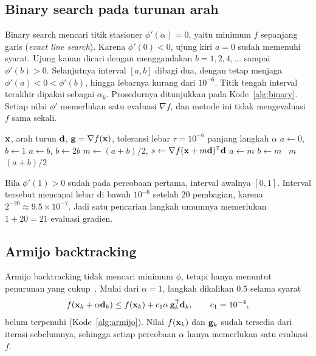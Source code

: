 \documentclass[12pt,a4paper]{article}
\begin{document}
\subsection{Binary search pada turunan arah}
Binary search mencari titik stasioner $\phi'(\alpha)=0$, yaitu minimum $f$ sepanjang garis (\emph{exact line
search}). Karena $\phi'(0)<0$, ujung kiri $a=0$ sudah memenuhi syarat. Ujung kanan dicari dengan menggandakan
$b=1,2,4,\dots$ sampai $\phi'(b)>0$. Selanjutnya interval $[a,b]$ dibagi dua, dengan tetap menjaga
$\phi'(a)<0<\phi'(b)$, hingga lebarnya kurang dari $10^{-6}$. Titik tengah interval terakhir dipakai sebagai
$\alpha_k$. Prosedurnya ditunjukkan pada Kode~\ref{alg:binary}. Setiap nilai $\phi'$ memerlukan satu evaluasi
$\nabla f$, dan metode ini tidak mengevaluasi $f$ sama sekali.

\begin{algorithm}[H]
\caption{Binary search pada $\phi'(\alpha)$.}\label{alg:binary}
\begin{algorithmic}[1]
\Require $\mathbf{x}$, arah turun $\mathbf{d}$, $\mathbf{g}=\nabla f(\mathbf{x})$, toleransi lebar $\tau=10^{-6}$
\Ensure panjang langkah $\alpha$
\State $a\gets0$, $b\gets1$
 
  \State $a\gets b$, $b\gets2b$
\EndWhile
{}
  \State $m\gets(a+b)/2$, $s\gets\nabla f(\mathbf{x}+m\mathbf{d})^{\mathsf{T}}\mathbf{d}$
   $a\gets m$  $b\gets m$ \Else\ \Return $m$ \EndIf
\EndWhile
\State \Return $(a+b)/2$
\end{algorithmic}
\end{algorithm}

Bila $\phi'(1)>0$ sudah pada percobaan pertama, interval awalnya $[0,1]$. Interval tersebut mencapai lebar di bawah
$10^{-6}$ setelah $20$ pembagian, karena $2^{-20}\approx9.5\times10^{-7}$. Jadi satu pencarian langkah umumnya
memerlukan $1+20=21$ evaluasi gradien.

\subsection{Armijo backtracking}
Armijo backtracking tidak mencari minimum $\phi$, tetapi hanya menuntut penurunan yang cukup~\cite{armijo}.
Mulai dari $\alpha=1$, langkah dikalikan $0.5$ selama syarat
\begin{equation}\label{eq:armijo}
f(\mathbf{x}_k+\alpha\mathbf{d}_k)\le f(\mathbf{x}_k)+c_1\alpha\,\mathbf{g}_k^{\mathsf{T}}\mathbf{d}_k,\qquad c_1=10^{-4},
\end{equation}
belum terpenuhi (Kode~\ref{alg:armijo}). Nilai $f(\mathbf{x}_k)$ dan $\mathbf{g}_k$ sudah tersedia dari iterasi
sebelumnya, sehingga setiap percobaan $\alpha$ hanya memerlukan satu evaluasi $f$.
\end{document}
